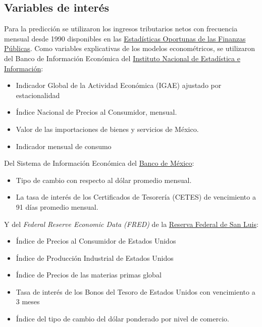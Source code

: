 \documentclass[a4paper, 11pt]{article}
\begin{document}
\subsection*{Variables de interés}
Para la predicción se utilizaron los ingresos tributarios netos con frecuencia mensual desde 1990 disponibles en las \href{http://www.shcp.gob.mx/POLITICAFINANCIERA/FINANZASPUBLICAS/Estadisticas_Oportunas_Finanzas_Publicas/Paginas/unica2.aspx}{Estadísticas Oportunas de las Finanzas Públicas}. Como variables explicativas de los modelos econométricos, se utilizaron del  Banco de Información Económica del \href{https://www.inegi.org.mx/sistemas/bie/}{Instituto Nacional de Estadística e Información}:
\begin{itemize}
\item Indicador Global de la Actividad Económica (IGAE) ajustado por estacionalidad
\item Índice Nacional de Precios al Consumidor, mensual.
\item Valor de las importaciones de bienes y servicios de México.
\item Indicador mensual de consumo
\end{itemize}
Del Sistema de Información Económica del \href{http://www.banxico.org.mx/SieInternet/}{Banco de México}:
\begin{itemize}
\item Tipo de cambio con respecto al dólar promedio mensual.
\item La tasa de interés de los Certificados de Tesorería (CETES) de vencimiento a 91 días promedio mensual.
\end{itemize}
Y del \textit{Federal Reserve Economic Data (FRED)} de la \href{https://fred.stlouisfed.org/}{Reserva Federal de San Luis}:
\begin{itemize}
\item Índice de Precios al Consumidor de Estados Unidos
\item Índice de Producción Industrial de Estados Unidos
\item Índice de Precios de las materias primas global
\item Tasa de interés de los Bonos del Tesoro de Estados Unidos con vencimiento a 3 meses
\item Índice del tipo de cambio del dólar ponderado por nivel de comercio.
\end{itemize}
\end{document}
